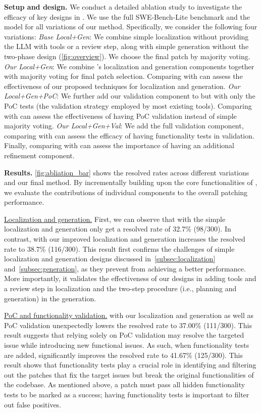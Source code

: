 \noindent\textbf{Setup and design.}
We conduct a detailed ablation study to investigate the efficacy of key designs in \sys.
We use the full SWE-Bench-Lite benchmark and the \claude model for all variations of our method.
Specifically, we consider the following four variations:
\noindent{}\textit{Base Local+Gen}: We combine simple localization without providing the LLM with tools or a review step, along with simple generation without the two-phase design (\cref{fig:overview}).
We choose the final patch by majority voting.
\noindent{}\textit{Our Local+Gen}: We combine \sys's localization and generation components together with majority voting for final patch selection. 
Comparing  with  can assess the effectiveness of our proposed techniques for localization and generation. 
\noindent{}\textit{Our Local+Gen+PoC}: We further add our validation component to  but with only the PoC tests (the validation strategy employed by most existing tools).
Comparing  with  can assess the effectiveness of having PoC validation instead of simple majority voting. 
\noindent{}\textit{Our Local+Gen+Val}: We add the full validation component, comparing  with  can assess the efficacy of having functionality tests in validation.
Finally, comparing  with \sys can assess the importance of having an additional refinement component. 

\noindent\textbf{Results.}
\cref{fig:abliation_bar} shows the resolved rates across different variations and our final method. 
By incrementally building upon the core functionalities of \sys, we evaluate the contributions of individual components to the overall patching performance.

\underline{Localization and generation.}
First, we can observe that  with the simple localization and generation only get a resolved rate of 32.7\% (98/300). 
In contrast,  with our improved localization and generation increases the resolved rate to 38.7\% (116/300).
This result first confirms the challenges of simple localization and generation designs discussed in~\cref{subsec:localization} and~\cref{subsec:generation}, as they prevent  from achieving a better performance.
More importantly, it validates the effectiveness of our designs in adding tools and a review step in localization and the two-step procedure (i.e., planning and generation) in the generation. 

\underline{PoC and functionality validation.}
 with our localization and generation as well as PoC validation unexpectedly lowers the resolved rate to 37.00\% (111/300). 
This result suggests that relying solely on PoC validation may resolve the targeted issue while introducing new functional issues. 
As such, when functionality tests are added,  significantly improves the resolved rate to 41.67\% (125/300). 
This result shows that functionality tests play a crucial role in identifying and filtering out the patches that fix the target issues but break the original functionalities of the codebase.
As mentioned above, a patch must pass all hidden functionality tests to be marked as a success; having functionality tests is important to filter out false positives. 


